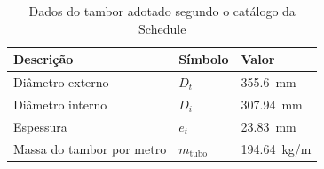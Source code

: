 \begin{table}[H]
  \centering
  \caption{Dados do tambor adotado segundo o catálogo da Schedule}
  \label{tab:dados_do_tambor_adotado}
  \begin{tabularx}{\textwidth}{>{\centering\arraybackslash}X>{\centering\arraybackslash}X>{\centering\arraybackslash}X}
    \toprule
    Descrição                 & Símbolo           & Valor                          \\
    \midrule
    Diâmetro externo          & $D_t$             & \SI{355.6}{\milli\meter}       \\
    Diâmetro interno          & $D_i$             & \SI{307.94}{\milli\meter}      \\
    Espessura                 & $e_t$             & \SI{23.83}{\milli\meter}       \\
    Massa do tambor por metro & $m_{\text{tubo}}$ & \SI{194.64}{\kilo\gram/\meter} \\
    \bottomrule
  \end{tabularx}
\end{table}
